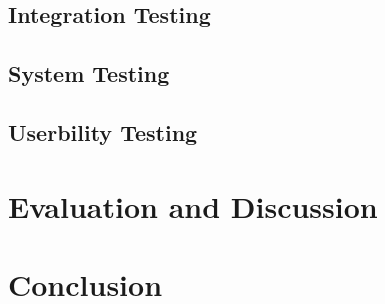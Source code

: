 \documentclass[11pt]{article}
\begin{document}
\subsection{Integration Testing}

\subsection{System Testing}

\subsection{Userbility Testing}


\section{Evaluation and Discussion}

\section{Conclusion}


%
 
\end{document}
